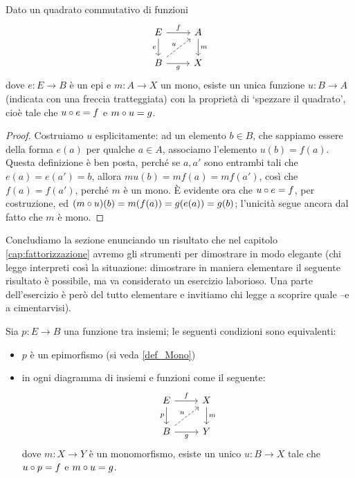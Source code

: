 \begin{proposition}
	Dato un quadrato commutativo di funzioni
	\[\begin{tikzcd}
			E \ar[r,"f"]\ar[d, "e"']& A\ar[d, "m"] \\
			B \ar[r, "g"']\ar[ur,dashed,"u"] & X
		\end{tikzcd}\]
	dove \(e : E\to B\) è un epi e \(m : A \to X\) un mono, esiste un unica funzione \(u : B\to A\) (indicata con una freccia tratteggiata) con la proprietà di `spezzare il quadrato', cioè tale che \(u\circ e=f\) e \(m\circ u=g\).
\end{proposition}
\begin{proof}
	Costruiamo \(u\) esplicitamente: ad un elemento \(b\in B\), che sappiamo essere della forma \(e(a)\) per qualche \(a\in A\), associamo l'elemento \(u(b)=f(a)\). Questa definizione è ben posta, perché se \(a,a'\) sono entrambi tali che \(e(a)=e(a')=b\), allora \(mu(b)=mf(a)=mf(a')\), così che \(f(a)=f(a')\), perché \(m\) è un mono. \`E evidente ora che \(u\circ e= f\), per costruzione, ed \((m\circ u)(b)=m(f(a))=g(e(a))=g(b)\); l'unicità segue ancora dal fatto che \(m\) è mono.
\end{proof}
Concludiamo la sezione enunciando un risultato che nel capitolo \ref{cap:fattorizzazione} avremo gli strumenti per dimostrare in modo elegante (chi legge interpreti così la situazione: dimostrare in maniera elementare il seguente risultato è possibile, ma va considerato un esercizio laborioso. Una parte dell'esercizio è però del tutto elementare e invitiamo chi legge a scoprire quale --e a cimentarvisi).
\begin{proposition}\label{caratt_epi_con_ort}
	Sia \(p : E \to B\) una funzione tra insiemi; le seguenti condizioni sono equivalenti:
	\begin{itemize}
		\item \(p\) è un epimorfismo (si veda \ref{def_Mono})
		\item in ogni diagramma di insiemi e funzioni come il seguente:
		      \[\begin{tikzcd}
				      E \ar[r, "f"]\ar[d, "p"']& X \ar[d, "m"]\\
				      B \ar[r, "g"'] \ar[ur, dashed, "u"]& Y
			      \end{tikzcd}\]
		      dove \(m : X\to Y\) è un monomorfismo, esiste un unico \(u : B\to X\) tale che \(u\circ p = f\) e \(m\circ u = g\).
	\end{itemize}
\end{proposition}
